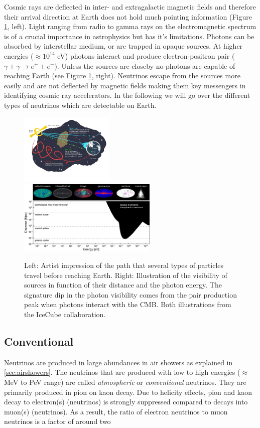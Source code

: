 Cosmic rays are deflected in inter- and extragalactic magnetic fields and therefore their arrival direction at Earth does not hold much pointing information (Figure \ref{fig:sourceinfo}, left). Light ranging from radio to gamma rays on the electromagnetic spectrum is of a crucial importance in astrophysics but has it's limitations. Photons can be absorbed by interstellar medium, or are trapped in opaque sources. At higher energies ($\approx 10^{14}$ eV) photons interact and produce electron-positron pair ($\gamma + \gamma \rightarrow e^+ + e^-$). Unless the sources are closeby no photons are capable of reaching Earth (see Figure \ref{fig:sourceinfo}, right). Neutrinos escape from the sources more easily and are not deflected by magnetic fields making them key messengers in identifying cosmic ray accelerators. In the following we will go over the different types of neutrinos which are detectable on Earth.

\begin{figure}[t]
\centering
\includegraphics[width=0.4\textwidth]{chapter3/img/sourceinformation_3.jpg}
\includegraphics[width=0.59\textwidth]{chapter3/img/opaque-to-photons.png}
\caption{Left: Artist impression of the path that several types of particles travel before reaching Earth. Right: Illustration of the visibility of sources in function of their distance and the photon energy. The signature dip in the photon visibility comes from the pair production peak when photons interact with the CMB. Both illustrations from the IceCube collaboration.}
\label{fig:sourceinfo}
\end{figure}


\subsection{Conventional}
Neutrinos are produced in large abundances in air showers as explained in \ref{sec:airshowers}. The neutrinos that are produced with low to high energies ($\approx$ MeV to PeV range) are called \textit{atmospheric} or \textit{conventional} neutrinos. They are primarily produced in pion on kaon decay. Due to helicity effects, pion and kaon decay to electron(s) (neutrinos) is strongly suppressed compared to decays into muon(s) (neutrinos). As a result, the ratio of electron neutrinos to muon neutrinos is a factor of around two

